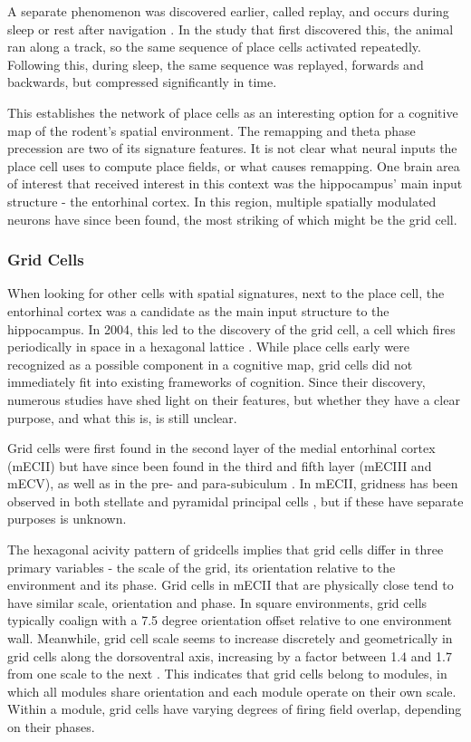 \documentclass{article}
\begin{document}
    A separate phenomenon was discovered earlier, called replay, and occurs during sleep or rest after navigation \parencite{Wilson1994,Olafsdottir2016}. In the study that first discovered this, the animal ran along a track, so the same sequence of place cells activated repeatedly. Following this, during sleep, the same sequence was replayed, forwards and backwards, but compressed significantly in time.

    This establishes the network of place cells as an interesting option for a cognitive map of the rodent's spatial environment. The remapping and theta phase precession are two of its signature features. It is not clear what neural inputs the place cell uses to compute place fields, or what causes remapping. One brain area of interest that received interest in this context was the hippocampus' main input structure - the entorhinal cortex. In this region, multiple spatially modulated neurons have since been found, the most striking of which might be the grid cell.

    \subsubsection{Grid Cells} \label{grid cells}
    When looking for other cells with spatial signatures, next to the place cell, the entorhinal cortex was a candidate as the main input structure to the hippocampus. In 2004, this led to the discovery of the grid cell, a cell which fires periodically in space in a hexagonal lattice \parencite{Hafting2005}. While place cells early were recognized as a possible component in a cognitive map, grid cells did not immediately fit into existing frameworks of cognition. Since their discovery, numerous studies have shed light on their features, but whether they have a clear purpose, and what this is, is still unclear. 

    Grid cells were first found in the second layer of the medial entorhinal cortex (mECII) but have since been found in the third and fifth layer (mECIII and mECV), as well as in the pre- and para-subiculum \parencite{Boccara2010}. In mECII, gridness has been observed in both stellate and pyramidal principal cells \parencite{Rowland2018}, but if these have separate purposes is unknown. 
    
    The hexagonal acivity pattern of gridcells implies that grid cells differ in three primary variables - the scale of the grid, its orientation relative to the environment and its phase. Grid cells in mECII that are physically close tend to have similar scale, orientation and phase. In square environments, grid cells typically coalign with a 7.5 degree orientation offset relative to one environment wall. Meanwhile, grid cell scale seems to increase discretely and geometrically in grid cells along the dorsoventral axis, increasing by a factor between 1.4 and 1.7 from one scale to the next \parencite{Stensola2012}. This indicates that grid cells belong to modules, in which all modules share orientation and each module operate on their own scale. Within a module, grid cells have varying degrees of firing field overlap, depending on their phases.
\end{document}
